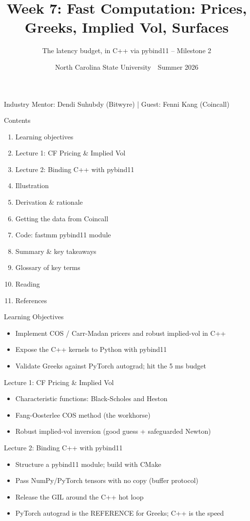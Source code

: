 \documentclass[aspectratio=169,10pt]{beamer}
\title{Week 7: Fast Computation: Prices, Greeks, Implied Vol, Surfaces}
\subtitle{The latency budget, in C++ via pybind11 -- Milestone 2}
\date{North Carolina State University \,\textbar\, Summer 2026}
\begin{document}
\begin{frame}[plain]\titlepage\begin{center}\tiny Industry Mentor: Dendi Suhubdy (Bitwyre)  |  Guest: Fenni Kang (Coincall)\end{center}\end{frame}
\begin{frame}{Contents}
\small\begin{enumerate}\setlength{\itemsep}{3pt}
  \item Learning objectives
  \item Lecture 1: CF Pricing \& Implied Vol
  \item Lecture 2: Binding C++ with pybind11
  \item Illustration
  \item Derivation \& rationale
  \item Getting the data from Coincall
  \item Code: fastmm pybind11 module
  \item Summary \& key takeaways
  \item Glossary of key terms
  \item Reading
  \item References
\end{enumerate}
\end{frame}

\begin{frame}{Learning Objectives}
\begin{itemize}
  \item Implement COS / Carr-Madan pricers and robust implied-vol in C++
  \item Expose the C++ kernels to Python with pybind11
  \item Validate Greeks against PyTorch autograd; hit the 5 ms budget
\end{itemize}
\end{frame}

\begin{frame}{Lecture 1: CF Pricing \& Implied Vol}
\begin{itemize}
  \item Characteristic functions: Black-Scholes and Heston
  \item Fang-Oosterlee COS method (the workhorse)
  \item Robust implied-vol inversion (good guess + safeguarded Newton)
\end{itemize}
\end{frame}

\begin{frame}{Lecture 2: Binding C++ with pybind11}
\begin{itemize}
  \item Structure a pybind11 module; build with CMake
  \item Pass NumPy/PyTorch tensors with no copy (buffer protocol)
  \item Release the GIL around the C++ hot loop
  \item PyTorch autograd is the REFERENCE for Greeks; C++ is the speed
\end{itemize}
\end{frame}
\end{document}
